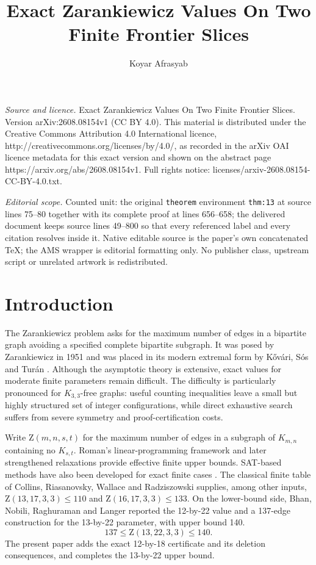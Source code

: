 \documentclass[10pt,a4paper]{amsart}
\newcommand{\Z}{\mathrm Z}
\begin{document}
\title[Exact Zarankiewicz Values On Two Finite Frontier Slices]{Exact Zarankiewicz Values On Two Finite Frontier Slices}
\author{Koyar Afrasyab}
\date{}
\maketitle
\noindent\emph{Source and licence.} Exact Zarankiewicz Values On Two Finite Frontier Slices. Version arXiv:2608.08154v1 (CC BY 4.0). This material is distributed under the Creative Commons Attribution 4.0 International licence, http://creativecommons.org/licenses/by/4.0/, as recorded in the arXiv OAI licence metadata for this exact version and shown on the abstract page https://arxiv.org/abs/2608.08154v1. Full rights notice: licenses/arxiv-2608.08154-CC-BY-4.0.txt.\par\smallskip
\noindent\textit{Editorial scope.} Counted unit: the original \texttt{theorem} environment \texttt{thm:13} at source lines 75--80 together with its complete proof at lines 656--658; the delivered document keeps source lines 49--800 so that every referenced label and every citation resolves inside it. Native editable source is the paper's own concatenated TeX; the AMS wrapper is editorial formatting only. No publisher class, upstream script or unrelated artwork is redistributed.
\section{Introduction}
The Zarankiewicz problem asks for the maximum number of edges in a bipartite graph avoiding a specified complete bipartite subgraph. It was posed by Zarankiewicz in 1951 \cite{Zarankiewicz1951} and was placed in its modern extremal form by K\H{o}v\'ari, S\'os and Tur\'an \cite{KST1954}. Although the asymptotic theory is extensive, exact values for moderate finite parameters remain difficult. The difficulty is particularly pronounced for $K_{3,3}$-free graphs: useful counting inequalities leave a small but highly structured set of integer configurations, while direct exhaustive search suffers from severe symmetry and proof-certification costs.

Write $\Z(m,n,s,t)$ for the maximum number of edges in a subgraph of $K_{m,n}$ containing no $K_{s,t}$. Roman's linear-programming framework \cite{Roman1975} and later strengthened relaxations \cite{DaviesGillHorsley2026} provide effective finite upper bounds. SAT-based methods have also been developed for exact finite cases \cite{Tan2022}. The classical finite table of Collins, Riasanovsky, Wallace and Radziszowski \cite{CollinsRiasanovskyWallaceRadziszowski2016} supplies, among other inputs, $\Z(13,17,3,3)\le110$ and $\Z(16,17,3,3)\le133$. On the lower-bound side, Bhan, Nobili, Raghuraman and Langer \cite{BhanNobiliLanger2026} reported the 12-by-22 value and a 137-edge construction for the 13-by-22 parameter, with upper bound 140.
\[
  137\le \Z(13,22,3,3)\le140.
\]
The present paper adds the exact 12-by-18 certificate and its deletion consequences, and completes the 13-by-22 upper bound.
\end{document}

